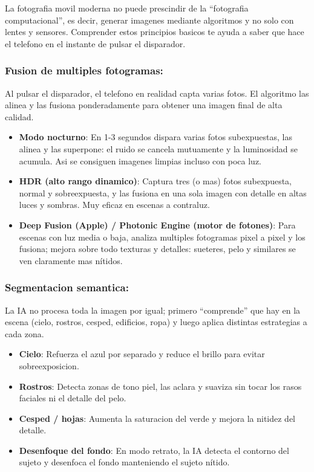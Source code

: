 
La fotografia movil moderna no puede prescindir de la “fotografia computacional”, es decir, generar imagenes mediante algoritmos y no solo con lentes y sensores. Comprender estos principios basicos te ayuda a saber que hace el telefono en el instante de pulsar el disparador.

\subsubsection*{Fusion de multiples fotogramas:}

Al pulsar el disparador, el telefono en realidad capta varias fotos. El algoritmo las alinea y las fusiona ponderadamente para obtener una imagen final de alta calidad.

\begin{itemize}
  \item \textbf{Modo nocturno}: En 1-3 segundos dispara varias fotos subexpuestas, las alinea y las superpone: el ruido se cancela mutuamente y la luminosidad se acumula. Asi se consiguen imagenes limpias incluso con poca luz.
  \item \textbf{HDR (alto rango dinamico)}: Captura tres (o mas) fotos subexpuesta, normal y sobreexpuesta, y las fusiona en una sola imagen con detalle en altas luces y sombras. Muy eficaz en escenas a contraluz.
  \item \textbf{Deep Fusion (Apple) / Photonic Engine (motor de fotones)}: Para escenas con luz media o baja, analiza multiples fotogramas pixel a pixel y los fusiona; mejora sobre todo texturas y detalles: sueteres, pelo y similares se ven claramente mas nítidos.
\end{itemize}

\subsubsection*{Segmentacion semantica:}

La IA no procesa toda la imagen por igual; primero “comprende” que hay en la escena (cielo, rostros, cesped, edificios, ropa) y luego aplica distintas estrategias a cada zona.

\begin{itemize}
  \item \textbf{Cielo}: Refuerza el azul por separado y reduce el brillo para evitar sobreexposicion.
  \item \textbf{Rostros}: Detecta zonas de tono piel, las aclara y suaviza sin tocar los rasos faciales ni el detalle del pelo.
  \item \textbf{Cesped / hojas}: Aumenta la saturacion del verde y mejora la nitidez del detalle.
  \item \textbf{Desenfoque del fondo}: En modo retrato, la IA detecta el contorno del sujeto y desenfoca el fondo manteniendo el sujeto nítido.
\end{itemize}

